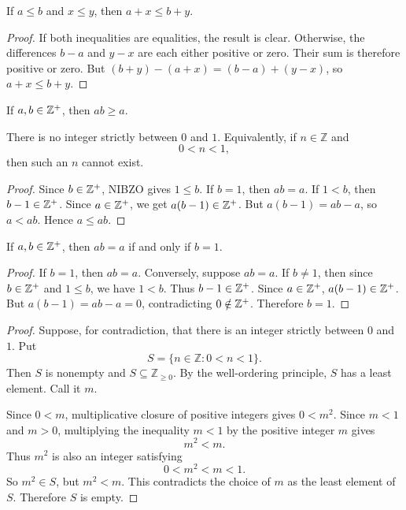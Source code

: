 \begin{lemma}
If $a\leq b$ and $x\leq y$, then $a+x\leq b+y$.
\end{lemma}

\begin{proof}
If both inequalities are equalities, the result is clear. Otherwise, the differences $b-a$ and $y-x$ are each either positive or zero. Their sum is therefore positive or zero. But $(b+y)-(a+x)=(b-a)+(y-x)$, so $a+x\leq b+y$.
\end{proof}


\begin{lemma}
If $a,b\in\mathbb{Z}^+$, then $ab\geq a$.
\end{lemma}

\begin{lemma}[NIBZO]
There is no integer strictly between $0$ and $1$.  Equivalently, if
$n\in\mathbb{Z}$ and
\[
0<n<1,
\]
then such an $n$ cannot exist.
\end{lemma}

\begin{proof}
Since $b\in\mathbb{Z}^+$, NIBZO gives $1\leq b$. If $b=1$, then $ab=a$. If $1<b$, then $b-1\in\mathbb{Z}^+$. Since $a\in\mathbb{Z}^+$, we get $a(b-1)\in\mathbb{Z}^+$. But $a(b-1)=ab-a$, so $a<ab$. Hence $a\leq ab$.
\end{proof}

\begin{lemma}
If $a,b\in\mathbb{Z}^+$, then $ab=a$ if and only if $b=1$.
\end{lemma}

\begin{proof}
If $b=1$, then $ab=a$. Conversely, suppose $ab=a$. If $b\neq1$, then since $b\in\mathbb{Z}^+$ and $1\leq b$, we have $1<b$. Thus $b-1\in\mathbb{Z}^+$. Since $a\in\mathbb{Z}^+$, $a(b-1)\in\mathbb{Z}^+$. But $a(b-1)=ab-a=0$, contradicting $0\notin\mathbb{Z}^+$. Therefore $b=1$.
\end{proof}

\begin{proof}
Suppose, for contradiction, that there is an integer strictly between $0$ and
$1$.  Put
\[
S=\{n\in\mathbb{Z}:0<n<1\}.
\]
Then $S$ is nonempty and $S\subseteq\mathbb{Z}_{\geq0}$.  By the well-ordering
principle, $S$ has a least element.  Call it $m$.

Since $0<m$, multiplicative closure of positive integers gives $0<m^2$.  Since
$m<1$ and $m>0$, multiplying the inequality $m<1$ by the positive integer $m$
gives
\[
m^2<m.
\]
Thus $m^2$ is also an integer satisfying
\[
0<m^2<m<1.
\]
So $m^2\in S$, but $m^2<m$.  This contradicts the choice of $m$ as the least
element of $S$.  Therefore $S$ is empty.
\end{proof}

